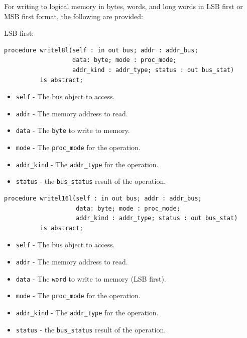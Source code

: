 \documentclass[10pt, openany]{book}
\newcommand{\keyword}[1]{\texttt{#1}}
\newcommand{\datatype}[1]{\texttt{#1}}
\begin{document}
For writing to logical memory in bytes, words, and long words in LSB first or MSB first format, the following are provided:

LSB first:
\begin{lstlisting}
procedure writel8l(self : in out bus; addr : addr_bus;
                   data: byte; mode : proc_mode;
                   addr_kind : addr_type; status : out bus_stat)
          is abstract;
\end{lstlisting}
\begin{itemize}
  \item \keyword{self} - The bus object to access.
  \item \keyword{addr} - The memory address to read.
  \item \keyword{data} - The \datatype{byte} to write to memory.
  \item \keyword{mode} - The \datatype{proc\_mode} for the operation.
  \item \keyword{addr\_kind} - The \datatype{addr\_type} for the operation.
  \item \keyword{status} - the \datatype{bus\_status} result of the operation.
\end{itemize}

\begin{lstlisting}
procedure writel16l(self : in out bus; addr : addr_bus;
                    data: byte; mode : proc_mode;
                    addr_kind : addr_type; status : out bus_stat)
          is abstract;
\end{lstlisting}
\begin{itemize}
  \item \keyword{self} - The bus object to access.
  \item \keyword{addr} - The memory address to read.
  \item \keyword{data} - The \datatype{word} to write to memory (LSB first).
  \item \keyword{mode} - The \datatype{proc\_mode} for the operation.
  \item \keyword{addr\_kind} - The \datatype{addr\_type} for the operation.
  \item \keyword{status} - the \datatype{bus\_status} result of the operation.
\end{itemize}
\end{document}
